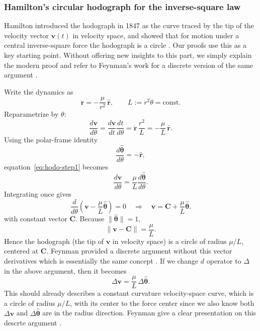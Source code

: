 \subsubsection{Hamilton's circular hodograph for the inverse-square law}

Hamilton introduced the hodograph in 1847 as the curve traced by the tip of the velocity vector $\mathbf v(t)$ in velocity space, and showed that for motion under a central inverse-square force the hodograph is a circle \cite{hamilton1847hodograph}. Our proofs use this as a key starting point. Without offering new insights to this part, we simply explain the modern proof and refer to Feynman's work for a discrete version of the same argument \cite{goodstein1996feynman}.

Write the dynamics as
\[
  \ddot{\mathbf r}=-\frac{\mu}{r^2}\,\hat{\mathbf r},
  \qquad
  L:=r^2\dot\theta=\text{const}.
\]
Reparametrize by $\theta$:
\begin{equation}
  \frac{d\mathbf v}{d\theta}
  =
  \frac{d\mathbf v}{dt}\frac{dt}{d\theta}
  =
  \ddot{\mathbf r}\,\frac{r^2}{L}
  =
  -\frac{\mu}{L}\,\hat{\mathbf r}.
\label{eq:hodo-step1}
\end{equation}
Using the polar-frame identity
\[
  \frac{d\hat{\boldsymbol\theta}}{d\theta}=-\hat{\mathbf r},
\]
equation~\eqref{eq:hodo-step1} becomes
\begin{equation}
  \frac{d\mathbf v}{d\theta}
  =
  \frac{\mu}{L}\frac{d\hat{\boldsymbol\theta}}{d\theta}.
\label{eq:hodo-step2}
\end{equation}
Integrating once gives
\begin{equation}
  \frac{d}{d\theta}\!\left(\mathbf v-\frac{\mu}{L}\hat{\boldsymbol\theta}\right)=0
  \quad\Longrightarrow\quad
  \mathbf v=\mathbf C+\frac{\mu}{L}\hat{\boldsymbol\theta}.
\label{eq:hodo-step3}
\end{equation}
with constant vector $\mathbf C$.
Because $\|\hat{\boldsymbol\theta}\|=1$,
\[
  \|\mathbf v-\mathbf C\|=\frac{\mu}{L}.
\]
Hence the hodograph (the tip of $\mathbf v$ in velocity space) is a circle of radius $\mu/L$, centered at $\mathbf C$. Feynman provided a discrete argument without this vector derivatives which is essentially the same concept \cite{goodstein1996feynman}. If we change $d$ operator to $\Delta$ in the above argument, then it becomes
\begin{equation}
  \Delta\mathbf v = \frac{\mu}{L}\,\Delta\hat{\boldsymbol \theta}.
\label{eq:hodo-step1-discrete}
\end{equation}
This should already describes a constant curvature velocity-space curve, which is a circle of radius $\mu/L$, with its center to the force center since we also know both $\Delta\mathbf{v}$ and $\Delta\hat{\boldsymbol\theta}$ are in the radius direction. Feynman give a clear presentation on this descrte argument \cite{goodstein1996feynman}.

